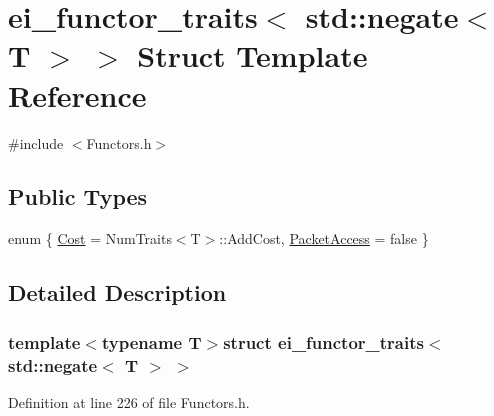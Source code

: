 \hypertarget{structei__functor__traits_3_01std_1_1negate_3_01_t_01_4_01_4}{\section{ei\-\_\-functor\-\_\-traits$<$ std\-:\-:negate$<$ T $>$ $>$ Struct Template Reference}
\label{structei__functor__traits_3_01std_1_1negate_3_01_t_01_4_01_4}
}


{\ttfamily \#include $<$Functors.\-h$>$}

\subsection*{Public Types}
\begin{DoxyCompactItemize}
\item 
enum \{ \hyperlink{structei__functor__traits_3_01std_1_1negate_3_01_t_01_4_01_4_ab93b8f34bae0a2ed419ba2fdf4a9968eaf3fefb72934891315710ec077f118fcc}{Cost} = Num\-Traits$<$T$>$\-:\-:Add\-Cost, 
\hyperlink{structei__functor__traits_3_01std_1_1negate_3_01_t_01_4_01_4_ab93b8f34bae0a2ed419ba2fdf4a9968ea756bd6354a007912b77de3d1a74bff90}{Packet\-Access} = false
 \}
\end{DoxyCompactItemize}


\subsection{Detailed Description}
\subsubsection*{template$<$typename T$>$struct ei\-\_\-functor\-\_\-traits$<$ std\-::negate$<$ T $>$ $>$}



Definition at line 226 of file Functors.\-h.



